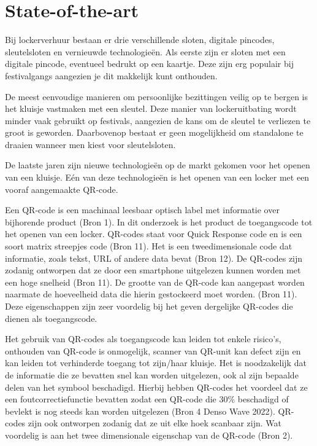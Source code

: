 \documentclass{hogent-article}
\begin{document}

\section{State-of-the-art}%
\label{sec:state-of-the-art}

Bij lockerverhuur bestaan er drie verschillende sloten, digitale pincodes, sleutelsloten en vernieuwde technologieën. Als eerste zijn er sloten met een digitale pincode, eventueel bedrukt op een kaartje. Deze zijn erg populair bij festivalgangs aangezien je dit makkelijk kunt onthouden. 

De meest eenvoudige manieren om persoonlijke bezittingen veilig op te bergen is het kluisje vastmaken met een sleutel. Deze manier van lockeruitbating wordt minder vaak gebruikt op festivals, aangezien de kans om de sleutel te verliezen te groot is geworden. Daarbovenop bestaat er geen mogelijkheid om standalone te draaien wanneer men kiest voor sleutelsloten. 

De laatste jaren zijn nieuwe technologieën op de markt gekomen voor het openen van een kluisje. Eén van deze technologieën is het openen van een locker met een vooraf aangemaakte QR-code.

Een QR-code is een machinaal leesbaar optisch label met informatie over bijhorende product (Bron 1). In dit onderzoek is het product de toegangscode tot het openen van een locker. QR-codes staat voor Quick Response code en is een soort matrix streepjes code (Bron 11). Het is een tweedimensionale code dat informatie, zoals tekst, URL of andere data bevat (Bron 12). De QR-codes zijn zodanig ontworpen dat ze door een smartphone uitgelezen kunnen worden met een hoge snelheid (Bron 11). De grootte van de QR-code kan aangepast worden naarmate de hoeveelheid data die hierin gestockeerd moet worden. (Bron 11). Deze eigenschappen zijn zeer voordelig bij het geven dergelijke QR-codes die dienen als toegangscode.

Het gebruik van QR-codes als toegangscode kan leiden tot enkele risico’s, onthouden van QR-code is onmogelijk, scanner van QR-unit kan defect zijn en kan leiden tot verhinderde toegang tot zijn/haar kluisje. Het is noodzakelijk dat de informatie die ze bevatten snel kan worden uitgelezen, ook al zijn bepaalde delen van het symbool beschadigd. Hierbij hebben QR-codes het voordeel dat ze een foutcorrectiefunctie bevatten zodat een QR-code die 30\% beschadigd of bevlekt is nog steeds kan worden uitgelezen (Bron 4 Denso Wave 2022). QR-codes zijn ook ontworpen zodanig dat ze uit elke hoek scanbaar zijn. Wat voordelig is aan het twee dimensionale eigenschap van de QR-code (Bron 2). 
\end{document}
